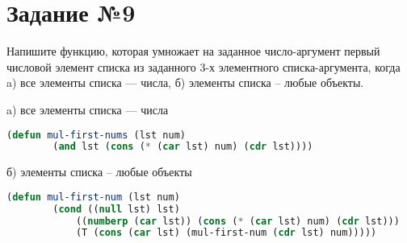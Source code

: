 \section{Задание №9}

Напишите функцию, которая умножает на заданное число-аргумент
первый числовой элемент списка из заданного 3-х элементного списка-аргумента, когда
a) все элементы списка --- числа,
б) элементы списка -- любые объекты.

a) все элементы списка --- числа
\begin{lstlisting}[language=Lisp]
	(defun mul-first-nums (lst num)
		(and lst (cons (* (car lst) num) (cdr lst))))
\end{lstlisting}

б) элементы списка -- любые объекты
\begin{lstlisting}[language=Lisp]
	(defun mul-first-num (lst num)
		(cond ((null lst) lst)
			((numberp (car lst)) (cons (* (car lst) num) (cdr lst)))
			(T (cons (car lst) (mul-first-num (cdr lst) num)))))
\end{lstlisting}
